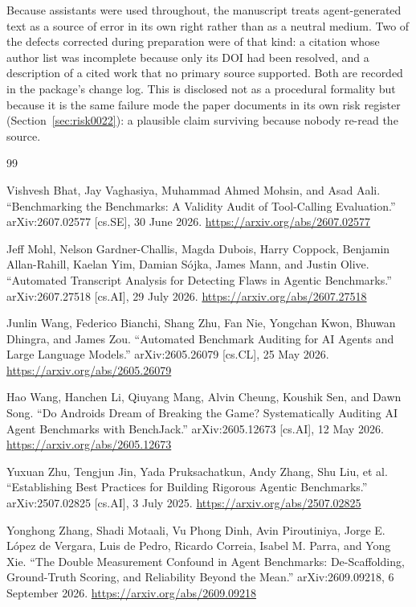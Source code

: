 \documentclass[11pt]{article}
\begin{document}
Because assistants were used throughout, the manuscript treats agent-generated
text as a source of error in its own right rather than as a neutral medium.
Two of the defects corrected during preparation were of that kind: a citation
whose author list was incomplete because only its DOI had been resolved, and a
description of a cited work that no primary source supported. Both are recorded
in the package's change log. This is disclosed not as a procedural formality
but because it is the same failure mode the paper documents in its own risk
register (Section~\ref{sec:risk0022}): a plausible claim surviving because
nobody re-read the source.

\begin{thebibliography}{99}

Vishvesh Bhat, Jay Vaghasiya, Muhammad Ahmed Mohsin, and Asad Aali.
``Benchmarking the Benchmarks: A Validity Audit of Tool-Calling Evaluation.''
arXiv:2607.02577 [cs.SE], 30 June 2026.
\url{https://arxiv.org/abs/2607.02577}

Jeff Mohl, Nelson Gardner-Challis, Magda Dubois, Harry Coppock,
Benjamin Allan-Rahill, Kaelan Yim, Damian S\'ojka, James Mann, and
Justin Olive.
``Automated Transcript Analysis for Detecting Flaws in Agentic Benchmarks.''
arXiv:2607.27518 [cs.AI], 29 July 2026.
\url{https://arxiv.org/abs/2607.27518}

Junlin Wang, Federico Bianchi, Shang Zhu, Fan Nie, Yongchan Kwon,
Bhuwan Dhingra, and James Zou.
``Automated Benchmark Auditing for AI Agents and Large Language Models.''
arXiv:2605.26079 [cs.CL], 25 May 2026.
\url{https://arxiv.org/abs/2605.26079}

Hao Wang, Hanchen Li, Qiuyang Mang, Alvin Cheung, Koushik Sen, and Dawn Song.
``Do Androids Dream of Breaking the Game? Systematically Auditing AI Agent
Benchmarks with BenchJack.''
arXiv:2605.12673 [cs.AI], 12 May 2026.
\url{https://arxiv.org/abs/2605.12673}

Yuxuan Zhu, Tengjun Jin, Yada Pruksachatkun, Andy Zhang, Shu Liu, et al.
``Establishing Best Practices for Building Rigorous Agentic Benchmarks.''
arXiv:2507.02825 [cs.AI], 3 July 2025.
\url{https://arxiv.org/abs/2507.02825}

Yonghong Zhang, Shadi Motaali, Vu Phong Dinh, Avin Piroutiniya,
Jorge E. L\'opez de Vergara, Luis de Pedro, Ricardo Correia,
Isabel M. Parra, and Yong Xie.
``The Double Measurement Confound in Agent Benchmarks: De-Scaffolding,
Ground-Truth Scoring, and Reliability Beyond the Mean.''
arXiv:2609.09218, 6 September 2026.
\url{https://arxiv.org/abs/2609.09218}


\end{thebibliography}
\end{document}
